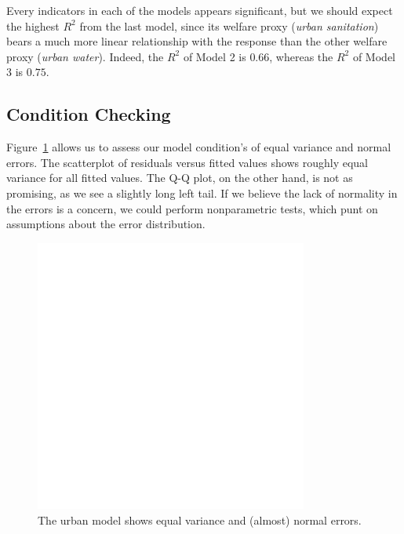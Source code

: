 \documentclass[11pt]{article}
\begin{document}
Every indicators in each of the models appears significant, but we should expect the highest $R^2$ from the last model, since its welfare proxy (\emph{urban sanitation}) bears a much more linear relationship with the response than the other welfare proxy (\emph{urban water}). Indeed, the $R^2$ of Model 2 is $0.66$, whereas the $R^2$ of Model 3 is $0.75$.


\subsection{Condition Checking}
Figure~\ref{urban_model_conditions} allows us to assess our model condition's of equal variance and normal errors. The scatterplot of residuals versus fitted values shows roughly equal variance for all fitted values. The Q-Q plot, on the other hand, is not as promising, as we see a slightly long left tail. If we believe the lack of normality in the errors is a concern, we could perform nonparametric tests, which punt on assumptions about the error distribution.

\begin{figure}[!ht]
  \centering
  \includegraphics[width=0.8\textwidth]{images/urban_model_conditions}
  \caption{\label{urban_model_conditions}The urban model shows equal variance and (almost) normal errors.}
\end{figure}
\end{document}
